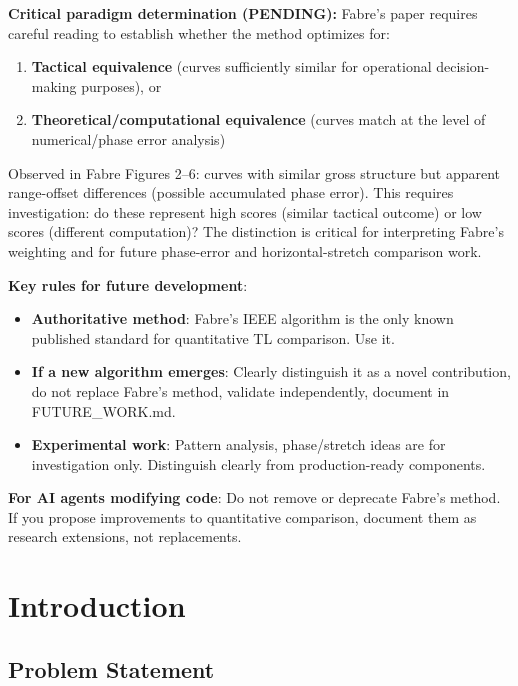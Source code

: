 \documentclass[11pt,letterpaper]{article}
\begin{document}
\noindent\textbf{Critical paradigm determination (PENDING):} Fabre's paper requires careful reading to establish whether the method optimizes for:
\begin{enumerate}
    \item \textbf{Tactical equivalence} (curves sufficiently similar for operational decision-making purposes), or
    \item \textbf{Theoretical/computational equivalence} (curves match at the level of numerical/phase error analysis)
\end{enumerate}
Observed in Fabre Figures 2--6: curves with similar gross structure but apparent range-offset differences (possible accumulated phase error). This requires investigation: do these represent high scores (similar tactical outcome) or low scores (different computation)? The distinction is critical for interpreting Fabre's weighting and for future phase-error and horizontal-stretch comparison work.

\noindent\textbf{Key rules for future development}:
\begin{itemize}
    \item \textbf{Authoritative method}: Fabre's IEEE algorithm \cite{fabre2009} is the only known published standard for quantitative TL comparison. Use it.
    \item \textbf{If a new algorithm emerges}: Clearly distinguish it as a novel contribution, do not replace Fabre's method, validate independently, document in FUTURE\_WORK.md.
    \item \textbf{Experimental work}: Pattern analysis, phase/stretch ideas are for investigation only. Distinguish clearly from production-ready components.
\end{itemize}

\noindent\textbf{For AI agents modifying code}: Do not remove or deprecate Fabre's method. If you propose improvements to quantitative comparison, document them as research extensions, not replacements.

\tableofcontents
\newpage

\section{Introduction}
\label{sec:intro}

\subsection{Problem Statement}
\end{document}
